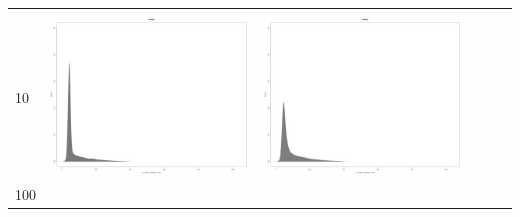 \begin{table}[htbp]
{\begin{tabular}{l | ccccc}
\begin{minipage}{.085\textwidth}
    				 \end{minipage}\\			
		10	   & \begin{minipage}{.085\textwidth}
     			 	\includegraphics[width=\linewidth]{images/mema-dens-graph/N2}
    				\end{minipage}
    			   & \begin{minipage}{.085\textwidth}
     			 	\includegraphics[width=\linewidth]{images/mema-dens-graph/N6}
    				 \end{minipage}\\		
		100	   & \begin{minipage}{.085\textwidth}

\end{minipage}
\end{tabular}}
\end{table}
